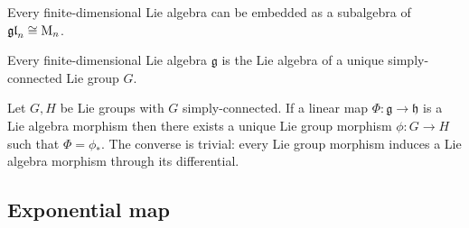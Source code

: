     \begin{theorem}[Ado]\label{lie:theorem:ado}
        Every finite-dimensional Lie algebra can be embedded as a subalgebra of $\mathfrak{gl}_n \cong \textup{M}_n$.
    \end{theorem}
    \begin{theorem}
        Every finite-dimensional Lie algebra $\mathfrak{g}$ is the Lie algebra of a unique simply-connected Lie group $G$.
    \end{theorem}

    \begin{property}\label{lie:prop_hom}
        Let $G, H$ be Lie groups with $G$ simply-connected. If a linear map $\Phi:\mathfrak{g}\rightarrow\mathfrak{h}$ is a Lie algebra morphism then there exists a unique Lie group morphism $\phi:G\rightarrow H$ such that $\Phi = \phi_*$. The converse is trivial: every Lie group morphism induces a Lie algebra morphism through its differential.
    \end{property}

\subsection{Exponential map}


